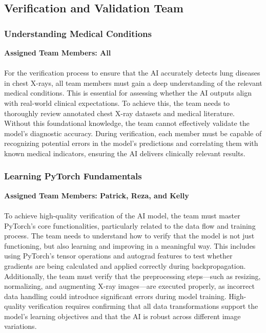 \documentclass[12pt, titlepage]{article}
\begin{document}
\subsection{Verification and Validation Team}


\subsubsection{Understanding Medical Conditions}
\textbf{Assigned Team Members: All} \\\\
For the verification process to ensure that the AI accurately detects lung diseases in chest X-rays, all team members must gain a deep understanding of the relevant medical conditions. This is essential for assessing whether the AI outputs align with real-world clinical expectations. To achieve this, the team needs to thoroughly review annotated chest X-ray datasets and medical literature. Without this foundational knowledge, the team cannot effectively validate the model’s diagnostic accuracy. During verification, each member must be capable of recognizing potential errors in the model’s predictions and correlating them with known medical indicators, ensuring the AI delivers clinically relevant results.
\subsubsection{Learning PyTorch Fundamentals}
\textbf{Assigned Team Members: Patrick, Reza, and Kelly}\\\\
To achieve high-quality verification of the AI model, the team must master PyTorch’s core functionalities, particularly related to the data flow and training process. The team needs to understand how to verify that the model is not just functioning, but also learning and improving in a meaningful way. This includes using PyTorch’s tensor operations and autograd features to test whether gradients are being calculated and applied correctly during backpropagation. Additionally, the team must verify that the preprocessing steps—such as resizing, normalizing, and augmenting X-ray images—are executed properly, as incorrect data handling could introduce significant errors during model training. High-quality verification requires confirming that all data transformations support the model’s learning objectives and that the AI is robust across different image variations.
\end{document}
